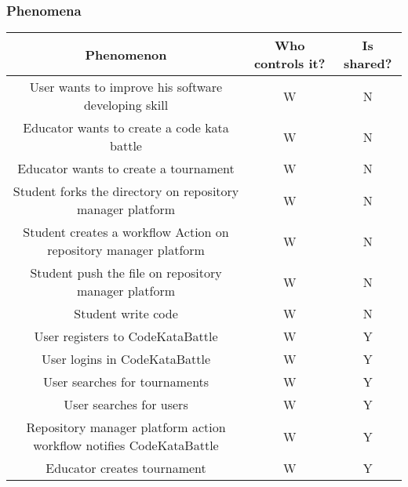\subsubsection{Phenomena}
\begin{center}
    \begin{table}[h]
        \begin{tabularx}{\textwidth}{| c| c| c|}
            \hline
            \rowcolor{blue!50}
            Phenomenon                                                            & Who controls it? & Is shared? \\
            \hline
            User wants to improve his software developing skill                   & W                & N          \\
            Educator wants to create a code kata battle                           & W                & N          \\
            Educator wants to create a tournament                                 & W                & N          \\
            Student forks the directory on repository manager platform            & W                & N          \\
            Student creates a workflow Action on repository manager platform      & W                & N          \\
            Student push the file on repository manager platform                  & W                & N          \\
            Student write code                                                    & W                & N          \\
            User registers to CodeKataBattle                                      & W                & Y          \\
            User logins in CodeKataBattle                                         & W                & Y          \\
            User searches for tournaments                                         & W                & Y          \\
            User searches for users                                               & W                & Y          \\
            Repository manager platform action workflow notifies CodeKataBattle   & W                & Y          \\
            Educator creates tournament                                           & W                & Y          \\

\end{tabularx}
\end{table}
\end{center}
